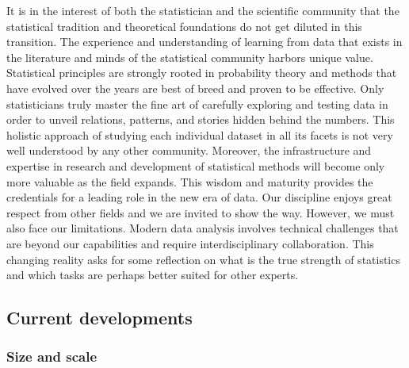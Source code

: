 It is in the interest of both the statistician and the scientific community that the statistical tradition and theoretical foundations do not get diluted in this transition. The experience and understanding of learning from data that exists in the literature and minds of the statistical community harbors unique value. Statistical principles are strongly rooted in probability theory and methods that have evolved over the years are best of breed and proven to be effective. Only statisticians truly master the fine art of carefully exploring and testing data in order to unveil relations, patterns, and stories hidden behind the numbers. This holistic approach of studying each individual dataset in all its facets is not very well understood by any other community. Moreover, the infrastructure and expertise in research and development of statistical methods will become only more valuable as the field expands. This wisdom and maturity provides the credentials for a leading role in the new era of data. Our discipline enjoys great respect from other fields and we are invited to show the way. 
However, we must also face our limitations. Modern data analysis involves technical challenges that are beyond our capabilities and require interdisciplinary collaboration. This changing reality asks for some reflection on what is the true strength of statistics and which tasks are perhaps better suited for other experts.

\subsection{Current developments}

\subsubsection{Size and scale}

